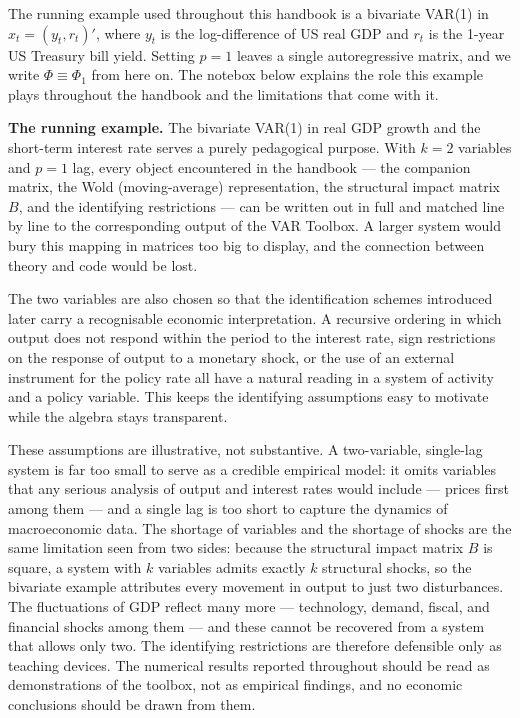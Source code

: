 \documentclass[12pt]{article}
\newcounter{boxcounter}[section]
\newcommand{\boxentry}[1]{%
    \addcontentsline{lob}{boxes}{\protect\numberline{\arabic{section}.\Alph{boxcounter}}#1}}
\begin{document}
The running example used throughout this handbook is a bivariate VAR(1) in $x_t=(y_t,r_t)'$, where $y_t$ is the log-difference of US real GDP and $r_t$ is the 1-year US Treasury bill yield. Setting $p=1$ leaves a single autoregressive matrix, and we write $\Phi\equiv\Phi_1$ from here on. The notebox below explains the role this example plays throughout the handbook and the limitations that come with it.

\begin{notebox}[label=box:example]
\boxentry{The running example}
\textbf{The running example.}
The bivariate VAR(1) in real GDP growth and the short-term interest rate serves a purely pedagogical purpose. With $k=2$ variables and $p=1$ lag, every object encountered in the handbook --- the companion matrix, the Wold (moving-average) representation, the structural impact matrix $B$, and the identifying restrictions --- can be written out in full and matched line by line to the corresponding output of the VAR Toolbox. A larger system would bury this mapping in matrices too big to display, and the connection between theory and code would be lost.\par

The two variables are also chosen so that the identification schemes introduced later carry a recognisable economic interpretation. A recursive ordering in which output does not respond within the period to the interest rate, sign restrictions on the response of output to a monetary shock, or the use of an external instrument for the policy rate all have a natural reading in a system of activity and a policy variable. This keeps the identifying assumptions easy to motivate while the algebra stays transparent.\par

These assumptions are illustrative, not substantive. A two-variable, single-lag system is far too small to serve as a credible empirical model: it omits variables that any serious analysis of output and interest rates would include --- prices first among them --- and a single lag is too short to capture the dynamics of macroeconomic data. The shortage of variables and the shortage of shocks are the same limitation seen from two sides: because the structural impact matrix $B$ is square, a system with $k$ variables admits exactly $k$ structural shocks, so the bivariate example attributes every movement in output to just two disturbances. The fluctuations of GDP reflect many more --- technology, demand, fiscal, and financial shocks among them --- and these cannot be recovered from a system that allows only two. The identifying restrictions are therefore defensible only as teaching devices. The numerical results reported throughout should be read as demonstrations of the toolbox, not as empirical findings, and no economic conclusions should be drawn from them.
\end{notebox}
\end{document}
